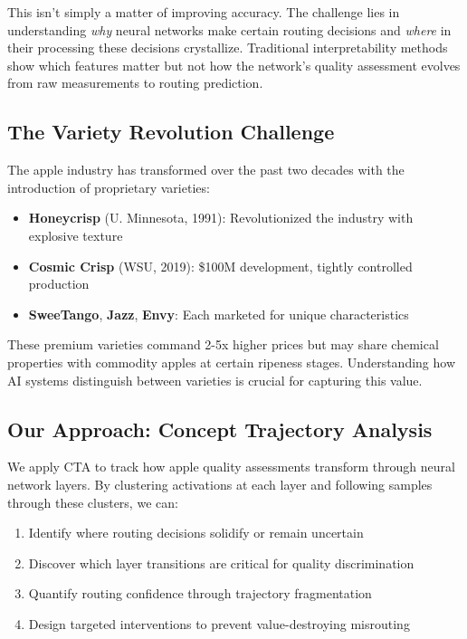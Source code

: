 \documentclass[11pt,a4paper]{article}
\begin{document}
This isn't simply a matter of improving accuracy. The challenge lies in understanding \textit{why} neural networks make certain routing decisions and \textit{where} in their processing these decisions crystallize. Traditional interpretability methods show which features matter but not how the network's quality assessment evolves from raw measurements to routing prediction.

\subsection{The Variety Revolution Challenge}

The apple industry has transformed over the past two decades with the introduction of proprietary varieties:
\begin{itemize}
    \item \textbf{Honeycrisp} (U. Minnesota, 1991): Revolutionized the industry with explosive texture
    \item \textbf{Cosmic Crisp} (WSU, 2019): \$100M development, tightly controlled production  
    \item \textbf{SweeTango}, \textbf{Jazz}, \textbf{Envy}: Each marketed for unique characteristics
\end{itemize}

These premium varieties command 2-5x higher prices but may share chemical properties with commodity apples at certain ripeness stages. Understanding how AI systems distinguish between varieties is crucial for capturing this value.

\subsection{Our Approach: Concept Trajectory Analysis}

We apply CTA to track how apple quality assessments transform through neural network layers. By clustering activations at each layer and following samples through these clusters, we can:
\begin{enumerate}
    \item Identify where routing decisions solidify or remain uncertain
    \item Discover which layer transitions are critical for quality discrimination  
    \item Quantify routing confidence through trajectory fragmentation
    \item Design targeted interventions to prevent value-destroying misrouting
\end{enumerate}
\end{document}
